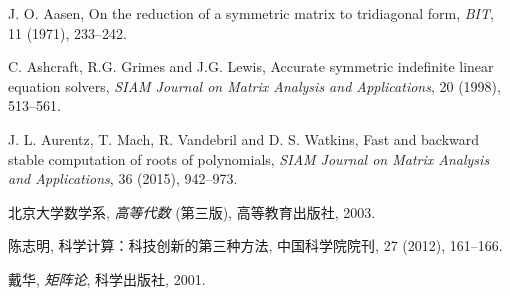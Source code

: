 \newcommand{\auth}[1]{\rm #1}
\newcommand{\refart}[1]{#1}
\newcommand{\refbook}[1]{\emph{#1}}
\newcommand{\journal}[1]{\emph{#1}}
%
\newcommand{\authc}[1]{{\song #1}}  %
\newcommand{\refartc}[1]{{\kai #1}}
\newcommand{\refbookc}[1]{{\kai #1}}
\newcommand{\journalc}[1]{{\song #1}}


\renewcommand{\leftmark}{参考文献}
\begin{thebibliography}{999}

\linespread{1.0}\selectfont

\auth{J. O. Aasen},
\refart{On the reduction of a symmetric matrix to tridiagonal form},
\journal{BIT}, 11 (1971), 233--242.

\auth{C. Ashcraft, R.G. Grimes and J.G. Lewis},
\refart{Accurate symmetric indefinite linear equation solvers},
\journal{SIAM Journal on Matrix Analysis and Applications}, 20 (1998), 513--561.

\auth{J. L. Aurentz, T. Mach, R. Vandebril and D. S. Watkins},
\refart{Fast and backward stable computation of roots of polynomials},
\journal{SIAM Journal on Matrix Analysis and Applications}, 36 (2015), 942--973.


\auth{北京大学数学系},
\refbook{高等代数} (第三版),
高等教育出版社, 2003.

\auth{陈志明},
\refartc{科学计算：科技创新的第三种方法},
中国科学院院刊, 27 (2012), 161--166.

\auth{戴华},
\refbook{矩阵论},
科学出版社, 2001.


\end{thebibliography}
